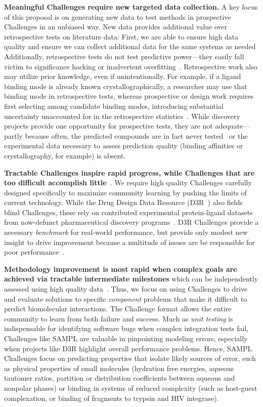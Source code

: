 \documentclass[11pt]{article}
\begin{document}
{\bf Meaningful Challenges require new targeted data collection.}
A key focus of this proposal is on generating new data to test methods in prospective Challenges in an unbiased way. 
New data provides additional value over retrospective tests on literature data:
First, we are able to ensure high data quality and ensure we can collect additional data for the same systems as needed
Additionally, retrospective tests do not test predictive power---they easily fall victim to significance hacking or inadvertent overfitting~\cite{Nuzzo:2015:Nature}.
Retrospective work also may utilize prior knowledge, even if unintentionally.  
For example, if a ligand binding mode is already known crystallographically, a researcher may use that binding mode in retrospective tests, whereas prospective or design work requires first selecting among candidate binding modes, introducing substantial uncertainty unaccounted for in the retrospective statistics~\cite{mobley_predicting_2007, boyce_predicting_2009, mobley_perspective_2012}.
While discovery projects provide one opportunity for prospective tests, they are not adequate---partly because often, the predicted compounds are in fact never tested~\cite{christ_binding_2016} or the experimental data necessary to assess prediction quality (binding affinities or crystallography, for example) is absent.

{\bf Tractable Challenges inspire rapid progress, while Challenges that are too difficult accomplish little}~\cite{Saez-Rodriguez:2016:NatRevGenet}. 
We require high quality Challenges carefully designed specifically to maximize community learning by pushing the limits of current technology.
While the Drug Design Data Resource (D3R~\cite{Gathiaka:2016:JComputAidedMolDes}) also fields blind Challenges, these rely on contributed experimental protein-ligand datasets from now-defunct pharmaceutical discovery programs~\cite{Gathiaka:2016:JComputAidedMolDes}. 
D3R Challenges provide a necessary \emph{benchmark} for real-world performance, but provide only modest new insight to drive improvement because a multitude of issues are be responsible for poor performance~\cite{D3R_lessons_learned}.

\textbf{Methodology improvement is most rapid when complex goals are achieved via tractable intermediate milestones} which can be independently assessed using high quality data~\cite{Saez-Rodriguez:2016:NatRevGenet}.
Thus, we focus on using Challenges to drive and evaluate solutions to specific \emph{component} problems that make it difficult to predict biomolecular interactions.
The Challenge format allows the entire community to learn from both failure and success.
Much as \emph{unit testing} is indispensable for identifying software bugs when complex integration tests fail, Challenges like SAMPL are valuable in pinpointing modeling errors, especially when projects like D3R highlight overall performance problems.
Hence, SAMPL Challenges focus on predicting properties that isolate likely sources of error, such as physical properties of small molecules (hydration free energies, aqueous tautomer ratios, partition or distribution coefficients between aqueous and nonpolar phases) or binding in systems of reduced complexity (such as host-guest complexation, or binding of fragments to trypsin and HIV integrase).
\end{document}
